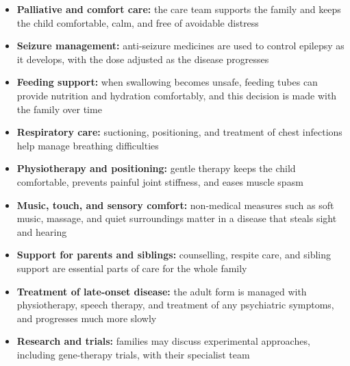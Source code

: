 \begin{itemize}
    \item \textbf{Palliative and comfort care:} the care team supports the family and keeps the child comfortable, calm, and free of avoidable distress
    \item \textbf{Seizure management:} anti-seizure medicines are used to control epilepsy as it develops, with the dose adjusted as the disease progresses
    \item \textbf{Feeding support:} when swallowing becomes unsafe, feeding tubes can provide nutrition and hydration comfortably, and this decision is made with the family over time
    \item \textbf{Respiratory care:} suctioning, positioning, and treatment of chest infections help manage breathing difficulties
    \item \textbf{Physiotherapy and positioning:} gentle therapy keeps the child comfortable, prevents painful joint stiffness, and eases muscle spasm
    \item \textbf{Music, touch, and sensory comfort:} non-medical measures such as soft music, massage, and quiet surroundings matter in a disease that steals sight and hearing
    \item \textbf{Support for parents and siblings:} counselling, respite care, and sibling support are essential parts of care for the whole family
    \item \textbf{Treatment of late-onset disease:} the adult form is managed with physiotherapy, speech therapy, and treatment of any psychiatric symptoms, and progresses much more slowly
    \item \textbf{Research and trials:} families may discuss experimental approaches, including gene-therapy trials, with their specialist team
\end{itemize}

